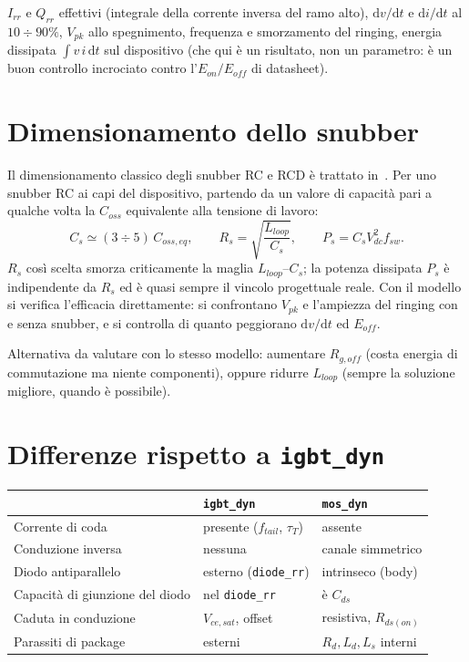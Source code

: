\documentclass[11pt,a4paper]{article}
\newcommand{\ssc}[1]{\texttt{#1}}
\newcommand{\ud}{\mathrm{d}}
\begin{document}
$I_{rr}$ e $Q_{rr}$ effettivi (integrale della corrente inversa del ramo
alto), $\ud v/\ud t$ e $\ud i/\ud t$ al $10\div90\%$, $V_{pk}$ allo
spegnimento, frequenza e smorzamento del ringing, energia dissipata
$\int v\,i\,\ud t$ sul dispositivo (che qui è un risultato, non un
parametro: è un buon controllo incrociato contro l'$E_{on}/E_{off}$ di
datasheet).

\section{Dimensionamento dello snubber}

Il dimensionamento classico degli snubber RC e RCD è trattato
in~\cite{McMurray1972,Mohan2003}. Per uno snubber RC ai capi del
dispositivo, partendo da un valore di
capacità pari a qualche volta la $C_{oss}$ equivalente alla tensione di
lavoro:
\begin{equation}
  C_s \simeq (3\div5)\,C_{oss,eq},
  \qquad
  R_s=\sqrt{\frac{L_{loop}}{C_s}},
  \qquad
  P_s = C_s V_{dc}^2 f_{sw}.
\end{equation}
$R_s$ così scelta smorza criticamente la maglia $L_{loop}$--$C_s$; la
potenza dissipata $P_s$ è indipendente da $R_s$ ed è quasi sempre il vincolo
progettuale reale. Con il modello si verifica l'efficacia direttamente:
si confrontano $V_{pk}$ e l'ampiezza del ringing con e senza snubber, e si
controlla di quanto peggiorano $\ud v/\ud t$ ed $E_{off}$.

Alternativa da valutare con lo stesso modello: aumentare $R_{g,off}$ (costa
energia di commutazione ma niente componenti), oppure ridurre $L_{loop}$
(sempre la soluzione migliore, quando è possibile).

\section{Differenze rispetto a \ssc{igbt\_dyn}}

\begin{center}
\begin{tabular}{lll}
\toprule
& \ssc{igbt\_dyn} & \ssc{mos\_dyn} \\
\midrule
Corrente di coda & presente ($f_{tail}$, $\tau_T$) & assente \\
Conduzione inversa & nessuna & canale simmetrico \\
Diodo antiparallelo & esterno (\ssc{diode\_rr}) & intrinseco (body) \\
Capacità di giunzione del diodo & nel \ssc{diode\_rr} & è $C_{ds}$ \\
Caduta in conduzione & $V_{ce,sat}$, offset & resistiva, $R_{ds(on)}$ \\
Parassiti di package & esterni & $R_d,L_d,L_s$ interni \\
\bottomrule
\end{tabular}
\end{center}
\end{document}
